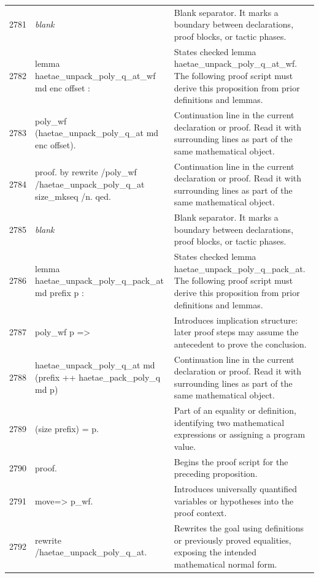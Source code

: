 \documentclass[10pt]{article}
\begin{document}
\begin{longtable}{r L{0.53\textwidth} L{0.37\textwidth}}
2781 & {\ttfamily\scriptsize \emph{blank}} & Blank separator.  It marks a boundary between declarations, proof blocks, or tactic phases. \\
2782 & {\ttfamily\scriptsize lemma haetae\_unpack\_poly\_q\_at\_wf md enc offset :} & States checked lemma haetae\_unpack\_poly\_q\_at\_wf.  The following proof script must derive this proposition from prior definitions and lemmas. \\
2783 & {\ttfamily\scriptsize   poly\_wf (haetae\_unpack\_poly\_q\_at md enc offset).} & Continuation line in the current declaration or proof.  Read it with surrounding lines as part of the same mathematical object. \\
2784 & {\ttfamily\scriptsize proof. by rewrite /poly\_wf /haetae\_unpack\_poly\_q\_at size\_mkseq /n. qed.} & Continuation line in the current declaration or proof.  Read it with surrounding lines as part of the same mathematical object. \\
2785 & {\ttfamily\scriptsize \emph{blank}} & Blank separator.  It marks a boundary between declarations, proof blocks, or tactic phases. \\
2786 & {\ttfamily\scriptsize lemma haetae\_unpack\_poly\_q\_pack\_at md prefix p :} & States checked lemma haetae\_unpack\_poly\_q\_pack\_at.  The following proof script must derive this proposition from prior definitions and lemmas. \\
2787 & {\ttfamily\scriptsize   poly\_wf p =>} & Introduces implication structure: later proof steps may assume the antecedent to prove the conclusion. \\
2788 & {\ttfamily\scriptsize   haetae\_unpack\_poly\_q\_at md (prefix ++ haetae\_pack\_poly\_q md p)} & Continuation line in the current declaration or proof.  Read it with surrounding lines as part of the same mathematical object. \\
2789 & {\ttfamily\scriptsize     (size prefix) = p.} & Part of an equality or definition, identifying two mathematical expressions or assigning a program value. \\
2790 & {\ttfamily\scriptsize proof.} & Begins the proof script for the preceding proposition. \\
2791 & {\ttfamily\scriptsize move=> p\_wf.} & Introduces universally quantified variables or hypotheses into the proof context. \\
2792 & {\ttfamily\scriptsize rewrite /haetae\_unpack\_poly\_q\_at.} & Rewrites the goal using definitions or previously proved equalities, exposing the intended mathematical normal form. \\

\end{longtable}
\end{document}
